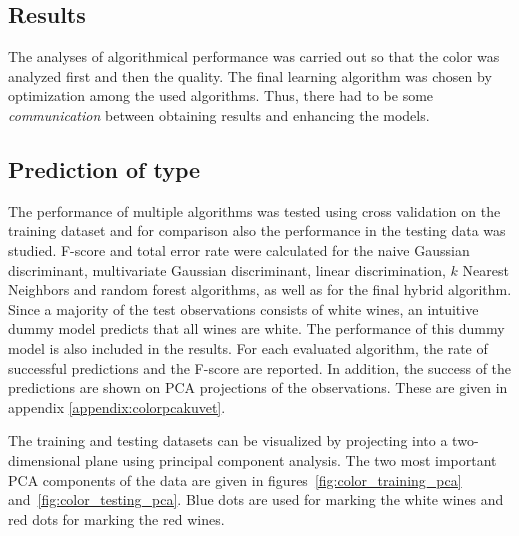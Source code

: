 \documentclass[twoside]{article}
\begin{document}
\begin{multicols}{2}


\section{Results}

The analyses of algorithmical performance was carried out so that the color was analyzed first and then the quality. The final learning algorithm
was chosen by optimization among the used algorithms. Thus, there had to be some \emph{communication} between obtaining results and enhancing the models.

\subsection{Prediction of type}

The performance of multiple algorithms was tested using cross validation on the training dataset and for comparison also the performance in the testing data was studied.
F-score and total error rate were calculated for the naive Gaussian discriminant, multivariate Gaussian discriminant, linear discrimination, $k$ Nearest Neighbors and random forest
algorithms, as well as for the final hybrid algorithm.
Since a majority of the test observations consists of white wines, an intuitive dummy model predicts that all wines are white. The performance of this dummy model
is also included in the results.
For each evaluated algorithm, the rate of successful predictions and the F-score are reported. In addition, the success of the predictions are shown on PCA projections
of the observations. These are given in appendix \ref{appendix:colorpcakuvet}.

The training and testing datasets can be visualized by projecting into a two-dimensional plane using principal component analysis. The two most important
PCA components of the data are given in figures~\ref{fig:color_training_pca} and~\ref{fig:color_testing_pca}. Blue dots are used for marking the white wines and red dots for marking the red wines.


\end{multicols}
\end{document}
